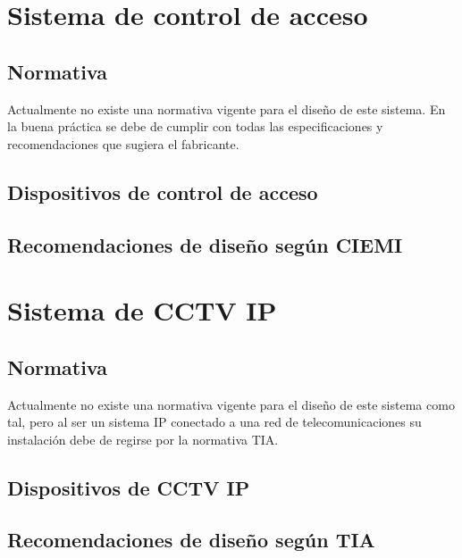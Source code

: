 \newpage


\section{Sistema de control de acceso}

\subsection{Normativa}

Actualmente no existe una normativa vigente para el diseño de este sistema. En la buena práctica se debe de cumplir con todas las especificaciones y recomendaciones que sugiera el fabricante.


\subsection{Dispositivos de control de acceso}

\subsection{Recomendaciones de diseño según CIEMI}


\newpage


\section{Sistema de CCTV IP}

\subsection{Normativa}

Actualmente no existe una normativa vigente para el diseño de este sistema como tal, pero al ser un sistema IP conectado a una red de telecomunicaciones su instalación debe de regirse por la normativa TIA.


\subsection{Dispositivos de CCTV IP}

\subsection{Recomendaciones de diseño según TIA}

